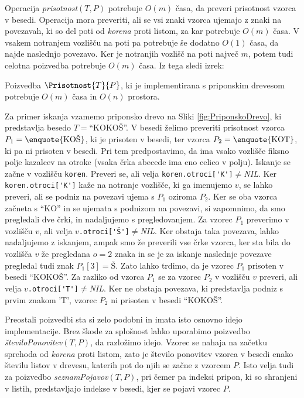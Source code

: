 Operacija \textit{prisotnost}$(T,P)$ potrebuje $O(m)$ časa, da preveri prisotnost vzorca v besedi. Operacija mora preveriti, ali se vsi znaki vzorca ujemajo z znaki na povezavah, ki so del poti od \textit{korena} proti listom, za kar potrebuje $O(m)$ časa. V vsakem notranjem vozlišču na poti pa potrebuje še dodatno $O(1)$ časa, da najde naslednjo povezavo. Ker je notranjih vozlišč na poti največ $m$, potem tudi celotna poizvedba potrebuje $O(m)$ časa. Iz tega sledi izrek:

\begin{izr}
    Poizvedba $\Prisotnost{T}{P}$, ki je implementirana s priponskim drevesom potrebuje $O(m)$ časa in $O(n)$ prostora.
\end{izr}

Za primer iskanja vzamemo priponsko drevo na Sliki \ref{fig:PriponskoDrevo}, ki predstavlja besedo $T=$\enquote{KOKOŠ}. V besedi želimo preveriti prisotnost vzorca $P_1=\text{\enquote{KOŠ}}$, ki je prisoten v besedi, ter vzorca $P_2=\text{\enquote{KOT}}$, ki pa ni prisoten v besedi. Pri tem predpostavimo, da ima vsako vozlišče fiksno polje kazalcev na otroke (vsaka črka abecede ima eno celico v polju). Iskanje se začne v vozlišču \verb|koren|. Preveri se, ali velja \verb|koren.otroci['K']|$\ne$\textit{NIL}. Ker \verb|koren.otroci['K']| kaže na notranje vozlišče, ki ga imenujemo $v$, se lahko preveri, ali se podniz na povezavi ujema s $P_1$ oziroma $P_2$. Ker se oba vzorca začneta s \enquote{KO} in se ujemata s podnizom na povezavi, si zapomnimo, da smo pregledali dve črki, in nadaljujemo s pregledovanjem. Za vzorec $P_1$ preverimo v vozlišču $v$, ali velja $v$\verb|.otroci['Š']|$\ne$\textit{NIL}. Ker obstaja taka povezava, lahko nadaljujemo z iskanjem, ampak smo že preverili vse črke vzorca, ker sta bila do vozlišča $v$ že pregledana $o=2$ znaka in se je za iskanje naslednje povezave pregledal tudi znak $P_1[3]=\text{Š}$. Zato lahko trdimo, da je vzorec $P_1$ prisoten v besedi \enquote{KOKOŠ}. Za razliko od vzorca $P_1$ se za vzorec $P_2$ v vozlišču $v$ preveri, ali velja $v$\verb|.otroci['T']|$\ne$\textit{NIL}. Ker ne obstaja povezava, ki predstavlja podniz s prvim znakom 'T', vzorec $P_2$ ni prisoten v besedi \enquote{KOKOŠ}.

Preostali poizvedbi sta si zelo podobni in imata isto osnovno idejo implementacije. Brez škode za splošnost lahko uporabimo poizvedbo \textit{številoPonovitev}$(T,P)$, da razložimo idejo. Vzorec se nahaja na začetku sprehoda od \textit{korena} proti listom, zato je število ponovitev vzorca v besedi enako številu listov v drevesu, katerih pot do njih se začne z vzorcem $P$. Isto velja tudi za poizvedbo \textit{seznamPojavov}$(T,P)$, pri čemer pa indeksi pripon, ki so shranjeni v listih, predstavljajo indekse v besedi, kjer se pojavi vzorec $P$.

